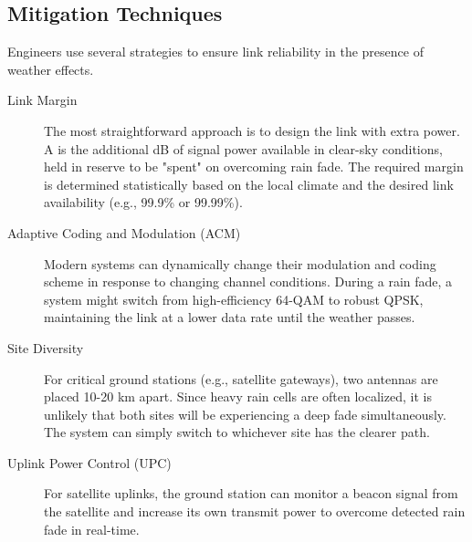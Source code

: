 \subsection{Mitigation Techniques}

Engineers use several strategies to ensure link reliability in the presence of weather effects.
\begin{description}
    \item[Link Margin] The most straightforward approach is to design the link with extra power. A  is the additional dB of signal power available in clear-sky conditions, held in reserve to be "spent" on overcoming rain fade. The required margin is determined statistically based on the local climate and the desired link availability (e.g., 99.9\% or 99.99\%).
    \item[Adaptive Coding and Modulation (ACM)] Modern systems can dynamically change their modulation and coding scheme in response to changing channel conditions. During a rain fade, a system might switch from high-efficiency 64-QAM to robust QPSK, maintaining the link at a lower data rate until the weather passes.
    \item[Site Diversity] For critical ground stations (e.g., satellite gateways), two antennas are placed 10-20 km apart. Since heavy rain cells are often localized, it is unlikely that both sites will be experiencing a deep fade simultaneously. The system can simply switch to whichever site has the clearer path.
    \item[Uplink Power Control (UPC)] For satellite uplinks, the ground station can monitor a beacon signal from the satellite and increase its own transmit power to overcome detected rain fade in real-time.
\end{description}



